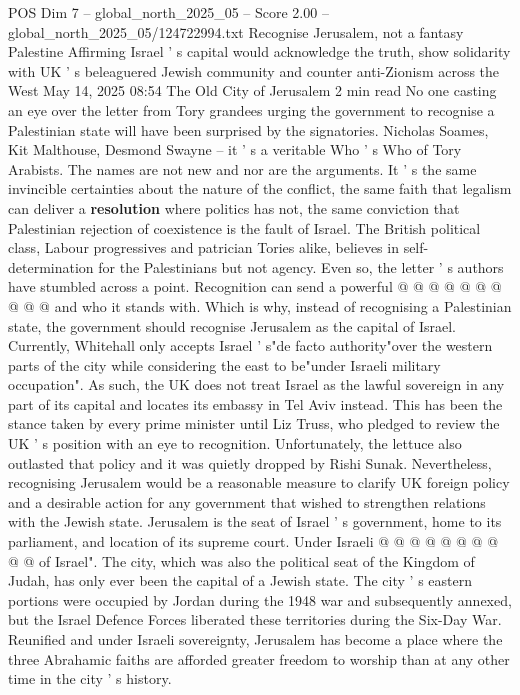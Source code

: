 \begin{textsample}{POS Dim 7 – global\_north\_2025\_05 – Score 2.00 – global\_north\_2025\_05/124722994.txt}  \label{ex:f7_pos_343}
Recognise Jerusalem, not a fantasy Palestine Affirming Israel ' s capital would acknowledge the truth, show solidarity with UK ' s beleaguered Jewish community and counter anti-Zionism across the West May 14, 2025 08:54 The Old City of Jerusalem 2 min read No one casting an eye over the letter from Tory grandees urging the government to recognise a Palestinian state will have been surprised by the signatories.
Nicholas Soames, Kit Malthouse, Desmond Swayne -- it ' s a veritable Who ' s Who of Tory Arabists.
The names are not new and nor are the arguments.
It ' s the same invincible certainties about the nature of the conflict, the same faith that legalism can deliver a \textbf{resolution} where politics has not, the same conviction that Palestinian rejection of coexistence is the fault of Israel.
The British political class, Labour progressives and patrician Tories alike, believes in self-determination for the Palestinians but not agency.
Even so, the letter ' s authors have stumbled across a point.
Recognition can send a powerful @ @ @ @ @ @ @ @ @ @ and who it stands with.
Which is why, instead of recognising a Palestinian state, the government should recognise Jerusalem as the capital of Israel.
Currently, Whitehall only accepts Israel ' s"de facto authority"over the western parts of the city while considering the east to be"under Israeli military occupation".
As such, the UK does not treat Israel as the lawful sovereign in any part of its capital and locates its embassy in Tel Aviv instead.
This has been the stance taken by every prime minister until Liz Truss, who pledged to review the UK ' s position with an eye to recognition.
Unfortunately, the lettuce also outlasted that policy and it was quietly dropped by Rishi Sunak.
Nevertheless, recognising Jerusalem would be a reasonable measure to clarify UK foreign policy and a desirable action for any government that wished to strengthen relations with the Jewish state.
Jerusalem is the seat of Israel ' s government, home to its parliament, and location of its supreme court.
Under Israeli @ @ @ @ @ @ @ @ @ @ of Israel".
The city, which was also the political seat of the Kingdom of Judah, has only ever been the capital of a Jewish state.
The city ' s eastern portions were occupied by Jordan during the 1948 war and subsequently annexed, but the Israel Defence Forces liberated these territories during the Six-Day War.
Reunified and under Israeli sovereignty, Jerusalem has become a place where the three Abrahamic faiths are afforded greater freedom to worship than at any other time in the city ' s history.

\end{textsample}
